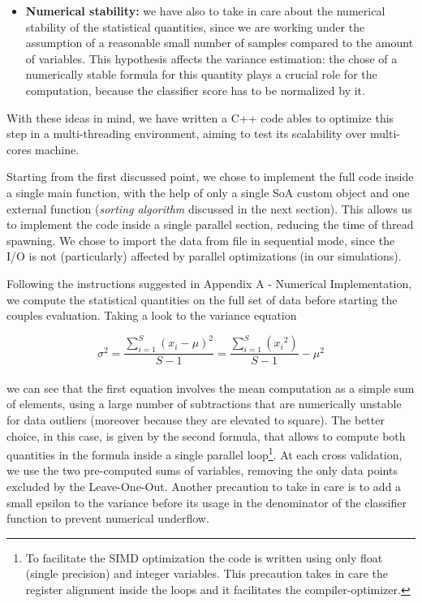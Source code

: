 \documentclass{standalone}
\begin{document}
\begin{itemize}
\item \textbf{Numerical stability:} we have also to take in care about the numerical stability of the statistical quantities, since we are working under the assumption of a reasonable small number of samples compared to the amount of variables.
This hypothesis affects the variance estimation: the chose of a numerically stable formula for this quantity plays a crucial role for the computation, because the classifier score has to be normalized by it.

\end{itemize}

With these ideas in mind, we have written a \textsf{C++} code ables to optimize this step in a multi-threading environment, aiming to test its scalability over multi-cores machine.

Starting from the first discussed point, we chose to implement the full code inside a single main function, with the help of only a single SoA custom object and one external function (\emph{sorting algorithm} discussed in the next section).
This allows us to implement the code inside a single parallel section, reducing the time of thread spawning.
We chose to import the data from file in sequential mode, since the I/O is not (particularly) affected by parallel optimizations (in our simulations).

Following the instructions suggested in Appendix A - Numerical Implementation, we compute the statistical quantities on the full set of data before starting the couples evaluation.
Taking a look to the variance equation

\begin{equation}
\sigma^2 = \frac{\sum_{i=1}^{S}(x_i - \mu)^2} {S - 1} = \frac{\sum_{i=1}^{S}({x_i}^2)} {S - 1} - \mu^2
\end{equation}
\\
we can see that the first equation involves the mean computation as a simple sum of elements, using a large number of subtractions that are numerically unstable for data outliers (moreover because they are elevated to square).
The better choice, in this case, is given by the second formula, that allows to compute both quantities in the formula inside a single parallel loop\footnote{
  To facilitate the SIMD optimization the code is written using only float (single precision) and integer variables.
  This precaution takes in care the register alignment inside the loops and it facilitates the compiler-optimizer.
}.
At each cross validation, we use the two pre-computed sums of variables, removing the only data points excluded by the Leave-One-Out.
Another precaution to take in care is to add a small epsilon to the variance before its usage in the denominator of the classifier function to prevent numerical underflow.
\end{document}
